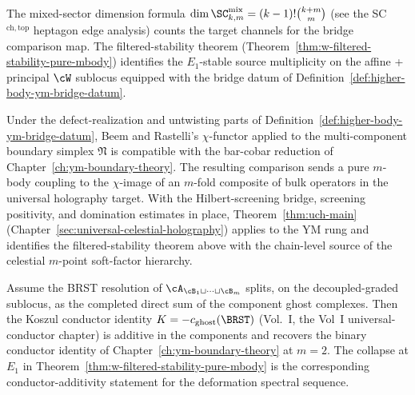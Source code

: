 \begin{remark}
\label{rem:ym-higher-body-mixed-sector}
The mixed-sector dimension formula
$\dim \SC^{\mathrm{mix}}_{k,m} = (k-1)!\binom{k+m}{m}$
(see the SC$^{\mathrm{ch,top}}$ heptagon edge analysis) counts the target
channels for the bridge comparison map. The filtered-stability theorem
(Theorem~\ref{thm:w-filtered-stability-pure-mbody}) identifies the
$E_1$-stable source multiplicity on the affine + principal $\cW$
sublocus equipped with the bridge datum of
Definition~\ref{def:higher-body-ym-bridge-datum}.
\end{remark}

\begin{remark}
\label{rem:ym-higher-body-chi-functor-descent}
Under the defect-realization and untwisting parts of
Definition~\ref{def:higher-body-ym-bridge-datum}, Beem and Rastelli's
$\chi$-functor \cite{BR15} applied to the multi-component boundary
simplex $\mathfrak N$ is compatible with the bar-cobar reduction of
Chapter~\ref{ch:ym-boundary-theory}. The resulting comparison sends a
pure $m$-body coupling to the $\chi$-image of an $m$-fold composite of
bulk operators in the universal holography target. With the
Hilbert-screening bridge, screening positivity, and domination estimates
in place, Theorem~\ref{thm:uch-main}
(Chapter~\ref{sec:universal-celestial-holography}) applies to the YM
rung and identifies the filtered-stability theorem above with the
chain-level source of the celestial $m$-point soft-factor hierarchy.
\end{remark}

\begin{remark}
\label{rem:ym-higher-body-universal-conductor}
Assume the BRST resolution of
$\cA_{\cB_1\sqcup\cdots\sqcup\cB_m}$ splits, on the decoupled-graded
sublocus, as the completed direct sum of the component ghost complexes.
Then the Koszul conductor identity $K=-c_{\mathrm{ghost}}(\BRST)$
(Vol.~I, the Vol~I universal-conductor chapter) is additive in the
components and recovers the binary conductor identity of
Chapter~\ref{ch:ym-boundary-theory} at $m=2$. The collapse at $E_1$ in
Theorem~\ref{thm:w-filtered-stability-pure-mbody} is the corresponding
conductor-additivity statement for the deformation spectral sequence.
\end{remark}
